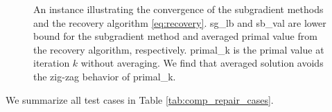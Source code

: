\documentclass[../main]{subfiles}
\begin{document}
\begin{figure}

  \caption{
    An instance illustrating the convergence of the subgradient methods
    and the recovery algorithm \eqref{eq:recovery}.
    \textsf{sg\_lb} and \textsf{sb\_val}  are lower bound for the subgradient method
    and averaged primal value from the recovery algorithm, respectively.
    \textsf{primal\_k} is the primal value at iteration \(k\) without averaging.
    We find that averaged solution avoids the zig-zag behavior of \textsf{primal\_k}.
  }

  \label{fig:divergent_volume}
\end{figure}


We summarize all test cases in Table \ref{tab:comp_repair_cases}.
\end{document}
